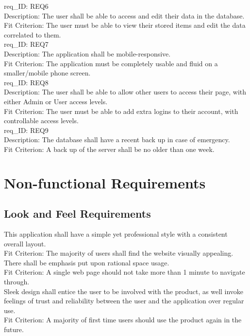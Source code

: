 \documentclass[12pt, titlepage]{article}
\begin{document}
\noindent
req\_ID: \label{REQ6}REQ6\\
Description: The user shall be able to access and edit their data in the database.\\
Fit Criterion: The user must be able to view their stored items and edit the data correlated to them.\\

\noindent
req\_ID: \label{REQ7}REQ7\\
Description: The application shall be mobile-responsive.\\
Fit Criterion: The application must be completely usable and fluid on a smaller/mobile phone screen.\\

\noindent
req\_ID: \label{REQ8}REQ8\\
Description: The user shall be able to allow other users to access their page, with either Admin or User access levels.\\
Fit Criterion: The user must be able to add extra logins to their account, with controllable access levels.\\

\noindent
req\_ID: \label{REQ9}REQ9\\
Description: The database shall have a recent back up in case of emergency.\\
Fit Criterion: A back up of the server shall be no older than one week.\\

\section{Non-functional Requirements} %
\subsection{Look and Feel Requirements}
This application shall have a simple yet professional style with a consistent overall layout.\\
Fit Criterion: The majority of users shall find the website visually appealing.\\

\noindent There shall be emphasis put upon rational space usage.\\
Fit Criterion: A single web page should not take more than 1 minute to navigate through.\\

\noindent Sleek design shall entice the user to be involved with the product, as well invoke feelings of trust and reliability between the user and the application over regular use.\\
Fit Criterion: A majority of first time users should use the product again in the future.
\end{document}
